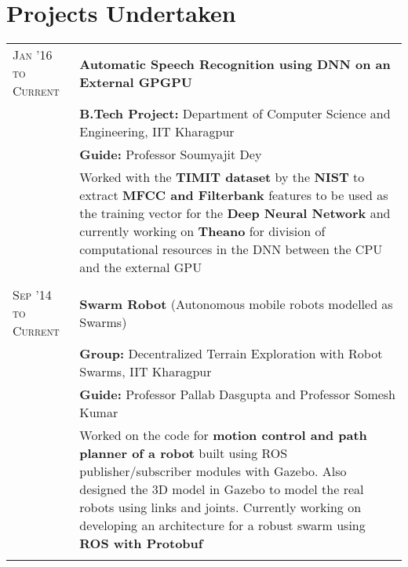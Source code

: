 \documentclass[a4paper,10pt]{extarticle} %
\begin{document}
\section{Projects Undertaken}

\begin{tabular}{R{3.0cm}|p{15.0cm}}
\textsc{Jan '16 to Current} & \textbf{Automatic Speech Recognition using DNN on an External GPGPU} \\
 & \textbf{B.Tech Project: }\textmd{Department of Computer Science and Engineering}, IIT Kharagpur\\
& \textbf{Guide: }\textmd{Professor Soumyajit Dey}\\
& \textmd{Worked with the \textbf{TIMIT dataset} by the \textbf{NIST} to extract \textbf{MFCC and Filterbank} features to be used as the training vector for the \textbf{Deep Neural Network} and currently working on \textbf{Theano} for division of computational resources in the DNN between the CPU and the external GPU}\\
 \\

\textsc{Sep '14 to Current} & \textbf{Swarm Robot} \textmd{(Autonomous mobile robots modelled as Swarms)} \\
 & \textbf{Group: }\textmd{Decentralized Terrain Exploration with Robot Swarms}, IIT Kharagpur\\
& \textbf{Guide: }\textmd{Professor Pallab Dasgupta} and \textmd{Professor Somesh Kumar}\\
& \textmd{Worked on the code for \textbf{motion control and path planner of a robot} built using ROS publisher/subscriber modules with Gazebo. Also designed the 3D model in Gazebo to model the real robots using links and joints. Currently working on developing an architecture for a robust swarm using \textbf{ROS with Protobuf}}\\
 \\


\end{tabular}
\end{document}
